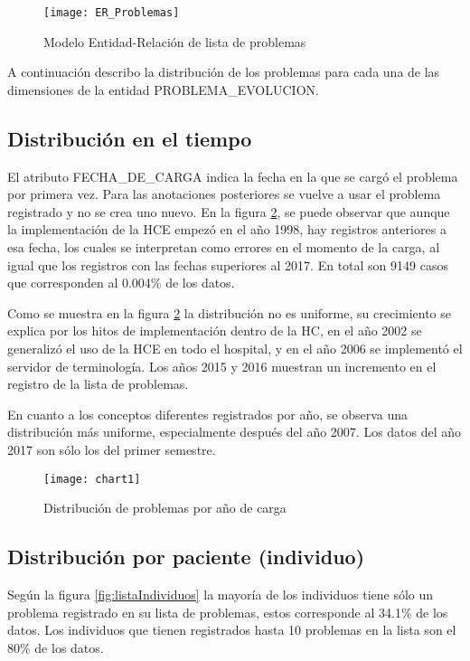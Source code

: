 \begin{figure}[htbp]
\caption{Modelo Entidad-Relación de lista de problemas}
\label{fig:ModeloER}
\centering
\texttt{[image: ER\_Problemas]}
\end{figure}

 A continuación describo la distribución de los problemas para cada una de las dimensiones de la entidad PROBLEMA\_EVOLUCION.
 
\subsection{Distribución en el tiempo}
El atributo FECHA\_DE\_CARGA indica la fecha en la que se cargó el problema por primera vez. Para las anotaciones posteriores se vuelve a usar el problema registrado y no se crea uno nuevo. En la figura \ref{fig:registrosYConceptos}, se puede observar que aunque la implementación de la \acrshort{HCE} empezó en el año 1998, hay registros anteriores a esa fecha, los cuales se interpretan como errores en el momento de la carga, al igual que los registros con las fechas superiores al 2017. En total son \num{9149} casos que corresponden al \num{0,004}\% de los datos.

Como se muestra en la figura \ref{fig:registrosYConceptos} la distribución no es uniforme, su crecimiento se explica por los hitos de implementación dentro de la HC, en el año \num{2002} se generalizó el uso de la HCE en todo el hospital, y en el año \num{2006} se implementó el servidor de terminología. Los años \num{2015} y \num{2016} muestran un incremento en el registro de la lista de problemas.

En cuanto a los conceptos diferentes registrados por año, se observa una distribución más uniforme, especialmente después del año \num{2007}. Los datos del año 2017 son sólo los del primer semestre.

\begin{figure}[htbp]
\caption{Distribución de problemas por año de carga}
\label{fig:registrosYConceptos}
\centering
\texttt{[image: chart1]}
\end{figure}

\subsection{Distribución por paciente (individuo)}
Según la figura \ref{fig:listaIndividuos} la mayoría de los individuos tiene sólo un problema registrado en su lista de problemas, estos corresponde al \num{34.1}\% de los datos. Los individuos que tienen registrados hasta 10 problemas en la lista son el \num{80}\% de los datos.

